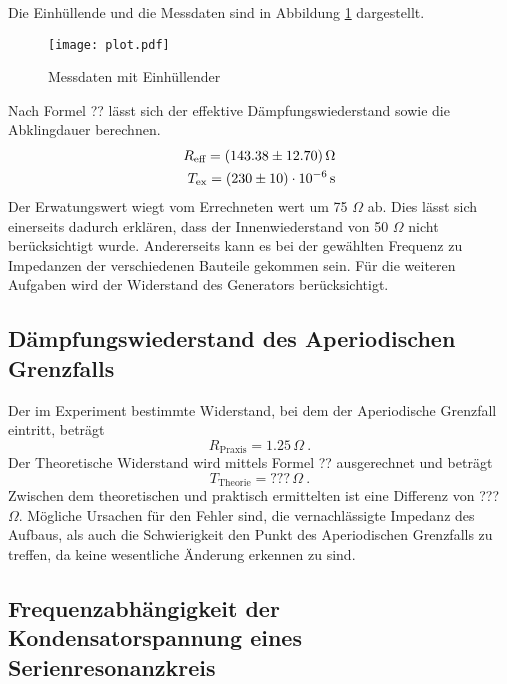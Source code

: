 Die Einhüllende und die Messdaten sind in Abbildung \ref{fig:Osz} dargestellt.
\begin{figure}
  \centering
  \texttt{[image: plot.pdf]}
  \caption{Messdaten mit Einhüllender}
  \label{fig:Osz}
\end{figure}
Nach Formel ?? lässt sich der effektive Dämpfungswiederstand sowie die Abklingdauer berechnen.
\begin{eqnarray}
  R_\text{eff} = ( \num{143.38 +- 12.7}) \, \Omega \\
  T_\text{ex} = ( \num{230 +- 10}) \cdot 10^{-6} \, \text{s}
  \label{eqn:Reff}
\end{eqnarray}
Der Erwatungswert wiegt vom Errechneten wert um 75 $\Omega$ ab. Dies lässt sich einerseits dadurch erklären, dass der Innenwiederstand von 50 $\Omega$ nicht berücksichtigt wurde. Andererseits kann es bei der gewählten Frequenz zu Impedanzen der verschiedenen Bauteile gekommen sein. Für die weiteren Aufgaben wird der Widerstand des Generators berücksichtigt.
\subsection{Dämpfungswiederstand des Aperiodischen Grenzfalls}
Der im Experiment bestimmte Widerstand, bei dem der Aperiodische Grenzfall eintritt, beträgt
\begin{equation}
  R_\text{Praxis} = 1.25 \, \Omega \ .
  \label{eqn:Rprax}
\end{equation}
Der Theoretische Widerstand wird mittels Formel ?? ausgerechnet und beträgt 
\begin{equation}
  T_\text{Theorie} = ??? \, \Omega \ .
  \label{eqn:Rthe}
\end{equation}
Zwischen dem theoretischen und praktisch ermittelten ist eine Differenz von ??? $\Omega$. Mögliche Ursachen für den Fehler sind, die vernachlässigte Impedanz des Aufbaus, als auch die Schwierigkeit den Punkt des Aperiodischen Grenzfalls zu treffen, da keine wesentliche Änderung erkennen zu sind. 
\subsection{Frequenzabhängigkeit der Kondensatorspannung eines  Serienresonanzkreis}



